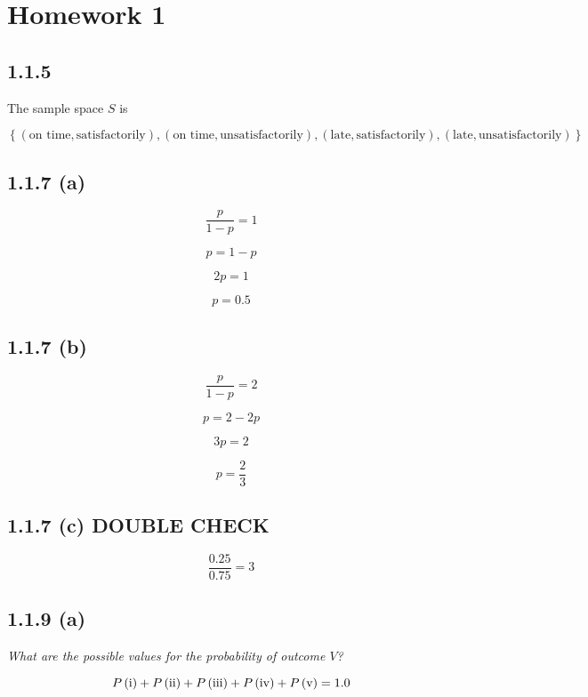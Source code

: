 \documentclass{article}
\begin{document}
\section*{Homework 1}

\subsection*{1.1.5}

The sample space $S$ is

\[
\left\{
\left(\text{on time}, \text{satisfactorily}\right),
\left(\text{on time}, \text{unsatisfactorily}\right),
\left(\text{late}, \text{satisfactorily}\right),
\left(\text{late}, \text{unsatisfactorily}\right)
\right\}
\]

\subsection*{1.1.7 (a)}

\[
\frac{p}{1-p} = 1
\]

\[
p = 1 - p
\]

\[
2p = 1
\]

\[
\boxed{p = 0.5}
\]

\subsection*{1.1.7 (b)}

\[
\frac{p}{1-p} = 2
\]

\[
p = 2 - 2p
\]

\[
3p = 2
\]

\[
\boxed{p = \frac{2}{3}}
\]

\subsection*{1.1.7 (c) DOUBLE CHECK}

\[
\boxed{\frac{0.25}{0.75} = 3}
\]

\subsection*{1.1.9 (a)}

\textit{What are the possible values for the probability of outcome $V$?}

\[
P\left(\textrm{\romannumeral 1}\right) +
P\left(\textrm{\romannumeral 2}\right) +
P\left(\textrm{\romannumeral 3}\right) +
P\left(\textrm{\romannumeral 4}\right) +
P\left(\textrm{\romannumeral 5}\right) =
1.0
\]
\end{document}
